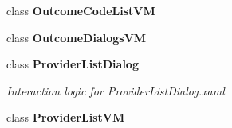 \begin{DoxyCompactItemize}
class \textbf{ Outcome\+Code\+List\+VM}
\item 
class \textbf{ Outcome\+Dialogs\+VM}
\item 
class \textbf{ Provider\+List\+Dialog}
\begin{DoxyCompactList}\small\item\em Interaction logic for Provider\+List\+Dialog.\+xaml \end{DoxyCompactList}\item 
class \textbf{ Provider\+List\+VM}
\end{DoxyCompactItemize}
